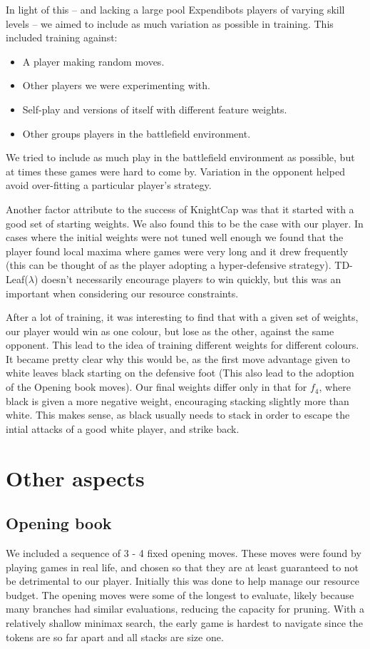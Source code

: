 \documentclass[11pt]{article}
\newcommand{\drafting}[1]{\textcolor{OliveGreen}{#1}}
\begin{document}
In light of this -- and lacking a large pool Expendibots players of varying skill levels -- we aimed to include as much variation as possible in training. This included training against:
\begin{itemize}
    \item A player making random moves.
    \item Other players we were experimenting with.
    \item Self-play and versions of itself with different feature weights.
    \item Other groups players in the battlefield environment.
\end{itemize}
We tried to include as much play in the battlefield environment as possible, but at times these games were hard to come by. Variation in the opponent helped avoid over-fitting a particular player's strategy.

Another factor \cite{baxter_tdleaflambda_1999} attribute to the success of KnightCap was that it started with a good set of starting weights. We also found this to be the case with our player. In cases where the initial weights were not tuned well enough we found that the player found local maxima where games were very long and it drew frequently (this can be thought of as the player adopting a hyper-defensive strategy). TD-Leaf($\lambda$) doesn't necessarily encourage players to win quickly, but this was an important when considering our resource constraints.

\drafting{After a lot of training, it was interesting to find that with a given set of weights, our player would win as one colour, but lose as the other, against the same opponent. This lead to the idea of training different weights for different colours. It became pretty clear why this would be, as the first move advantage given to white leaves black starting on the defensive foot (This also lead to the adoption of the Opening book moves). Our final weights differ only in that for $f_4$, where black is given a more negative weight, encouraging stacking slightly more than white. This makes sense, as black usually needs to stack in order to escape the intial attacks of a good white player, and strike back.}

\section{Other aspects}
\subsection{Opening book} \label{sec:opening-book}
We included a sequence of \drafting{3 - 4} fixed opening moves. These moves were found by playing games in real life, and chosen so that they are at least guaranteed to not be detrimental to our player. Initially this was done to help manage our resource budget. The opening moves were some of the longest to evaluate, likely because many branches had similar evaluations, reducing the capacity for pruning. With a relatively shallow minimax search, the early game is hardest to navigate since the tokens are so far apart and all stacks are size one.
\end{document}
